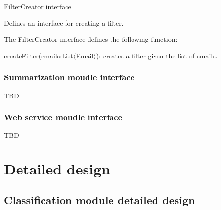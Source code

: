\begin{my_itemize}
  \item FilterCreator interface
  \begin{my_desc}
   \item[Purpose] Defines an interface for creating a filter.
   \item[Function] The FilterCreator interface defines the following function:
	\begin{my_itemize}
	\item createFilter(emails:List$\langle$Email$\rangle$): creates a filter given the list of emails.
	\end{my_itemize}
  \end{my_desc}

\end{my_itemize}

\subsubsection{Summarization moudle interface}
TBD

\subsubsection{Web service moudle interface}
TBD

\section{Detailed design}

\subsection{Classification module detailed design}

